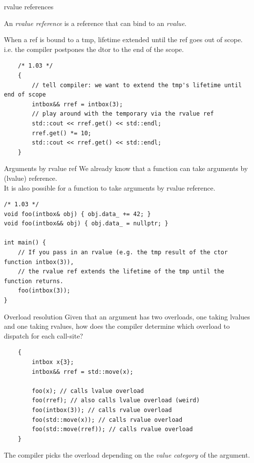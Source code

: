 \begin{frame}[fragile]{rvalue references}
  \begin{sqt:definition}
    An \emph{rvalue reference} is a reference that can bind to an \emph{rvalue}.
  \end{sqt:definition}
  \begin{sqt:result}
    When a ref is bound to a tmp, lifetime extended until the ref goes out of scope.\\
    i.e. the compiler postpones the dtor to the end of the scope.
  \end{sqt:result}

  \begin{verbatim}
    /* 1.03 */
    {
        // tell compiler: we want to extend the tmp's lifetime until end of scope
        intbox&& rref = intbox(3);
        // play around with the temporary via the rvalue ref
        std::cout << rref.get() << std::endl;
        rref.get() *= 10;
        std::cout << rref.get() << std::endl;
    }
  \end{verbatim}
\end{frame}

\begin{frame}[fragile]{Arguments by rvalue ref}
  We already know that a function can take arguments by (lvalue) reference.\\
  It is also possible for a function to take arguments by rvalue reference.

  \begin{verbatim}
/* 1.03 */
void foo(intbox& obj) { obj.data_ += 42; }
void foo(intbox&& obj) { obj.data_ = nullptr; }

int main() {
    // If you pass in an rvalue (e.g. the tmp result of the ctor function intbox(3)),
    // the rvalue ref extends the lifetime of the tmp until the function returns.
    foo(intbox(3));
}
  \end{verbatim}
\end{frame}

\begin{frame}[fragile]{Overload resolution}
  Given that an argument has two overloads, one taking lvalues and one taking rvalues,
  how does the compiler determine which overload to dispatch for each call-site?

  \begin{verbatim}
    {
        intbox x{3};
        intbox&& rref = std::move(x);

        foo(x); // calls lvalue overload
        foo(rref); // also calls lvalue overload (weird)
        foo(intbox(3)); // calls rvalue overload
        foo(std::move(x)); // calls rvalue overload
        foo(std::move(rref)); // calls rvalue overload
    }
  \end{verbatim}

  \begin{sqt:result}
    The compiler picks the overload depending on the \emph{value category} of the argument.
  \end{sqt:result}
\end{frame}

